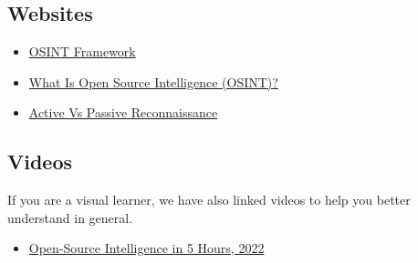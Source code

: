 \subsection{Websites}
\begin{itemize}
    \item \href{https://osintframework.com}{OSINT Framework}
    \item \href{https://www.sentinelone.com/cybersecurity-101/open-source-intelligence-osint/}{What Is Open Source Intelligence (OSINT)?}
    \item \href{https://asmed.com/active-vs-passive-reconnaissance/}{Active Vs Passive Reconnaissance}
\end{itemize}


\subsection{Videos}
If you are a visual learner, we have also linked videos to help you better understand in general. \\
\begin{itemize}
    \item \href{https://www.youtube.com/watch?v=qwA6MmbeGNo}{Open-Source Intelligence in 5 Hours, 2022}
\end{itemize}